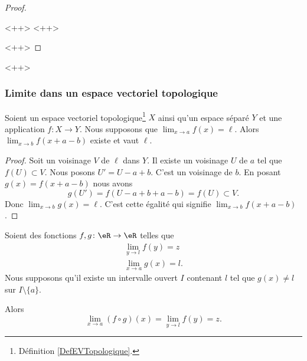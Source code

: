 \begin{proof}
\begin{subproof}
        \spitem[\ref{ITEMooDKOYooUpEfOR} \( \Rightarrow\) \ref{ITEMooFSSMooCQzTIc}]
        \spitem[\ref{ITEMooFSSMooCQzTIc} \( \Rightarrow\) \ref{ITEMooMUELooWdJQeW}]
         <++>
        <++>
    \end{subproof}
    <++>
\end{proof}
<++>

\subsubsection{Limite dans un espace vectoriel topologique}


\begin{lemma}      \label{LEMooAHIGooJhpPvo}
	Soient un espace vectoriel topologique\footnote{Définition \ref{DefEVTopologique}.} \( X\) ainsi qu'un espace séparé \( Y\) et une application \( f\colon X\to Y\). Nous supposons que \( \lim_{x\to a}f(x)=\ell\). Alors \( \lim_{x\to b} f(x+a-b)\) existe et vaut \( \ell\).
\end{lemma}

\begin{proof}
	Soit un voisinage \( V\) de \( \ell\) dans \( Y\). Il existe un voisinage \( U\) de \( a\) tel que \( f(U)\subset V\). Nous posons \( U'=U-a+b\). C'est un voisinage de \( b\). En posant \( g(x)=f(x+a-b)\) nous avons
	\begin{equation}
		g(U')=f(U-a+b+a-b)=f(U)\subset V.
	\end{equation}
	Donc \( \lim_{x\to b}g(x)=\ell\). C'est cette égalité qui signifie \( \lim_{x\to b}f(x+a-b)\).
\end{proof}


\begin{proposition}        \label{PROPooFGWXooFjvTYj}
    Soient des fonctions \( f,g\colon \eR\to \eR\) telles que
    \begin{subequations}
        \begin{align}
            \lim_{y\to l} f(y)=z\\
            \lim_{x\to a} g(x)=l.
        \end{align}
    \end{subequations}
    Nous supposons qu'il existe un intervalle ouvert \( I\) contenant \( l\) tel que \( g(x)\neq l\) sur \( I\setminus\{ a \}\).

    Alors
    \begin{equation}
        \lim_{x\to a} (f\circ g)(x)=\lim_{y\to l} f(y)=z.
    \end{equation}
\end{proposition}

